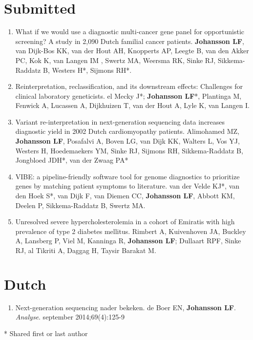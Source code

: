 \begin{appendices}
	\section*{Submitted}
	\begin{enumerate}
		\item What if we would use a diagnostic multi-cancer gene panel for opportunistic screening? A study in 2,090 Dutch familial cancer patients.  \textbf{Johansson LF}, van Dijk-Bos KK, van der Hout AH, Knopperts AP, Leegte B, van den Akker PC, Kok K, van Langen IM , Swertz MA, Weersma RK, Sinke RJ, Sikkema-Raddatz B, Westers H*,  Sijmons RH*.
		\item Reinterpretation, reclassification, and its downstream effects: Challenges for clinical laboratory geneticists. el Mecky J*; \textbf{Johansson LF}*, Plantinga M, Fenwick A, Lucassen A, Dijkhuizen T, van der Hout A, Lyle K, van Langen I.
		\item Variant re-interpretation in next-generation sequencing data increases diagnostic yield in 2002 Dutch cardiomyopathy patients. Alimohamed MZ, \textbf{Johansson LF}, Posafalvi A, Boven LG, van Dijk KK, Walters L, Vos YJ, Westers H, Hoedemaekers YM, Sinke RJ, Sijmons RH, Sikkema-Raddatz B, Jongbloed JDH*, van der Zwaag PA*
		\item VIBE: a pipeline-friendly software tool for genome diagnostics to prioritize genes by matching patient symptoms to literature. van der Velde KJ*, van den Hoek S*, van Dijk F, van Diemen CC, \textbf{Johansson LF}, Abbott KM, Deelen P, Sikkema-Raddatz B, Swertz MA. 
		\item Unresolved severe hypercholesterolemia in a cohort of Emiratis with high prevalence of type 2 diabetes mellitus. Rimbert A, Kuivenhoven JA, Buckley A, Lansberg P, Viel M, Kanninga R, \textbf{Johansson LF}; Dullaart RPF, Sinke RJ, al Tikriti A, Daggag H, Taysir Barakat M.
	\end{enumerate}
	
	\section*{Dutch}
	\begin{enumerate}
		\item Next-generation sequencing nader bekeken. de Boer EN, \textbf{Johansson LF}. \textsl{Analyse}. september 2014;69(4):125-9 \\
	\end{enumerate}
	
	* Shared first or last author
	

\end{appendices}
